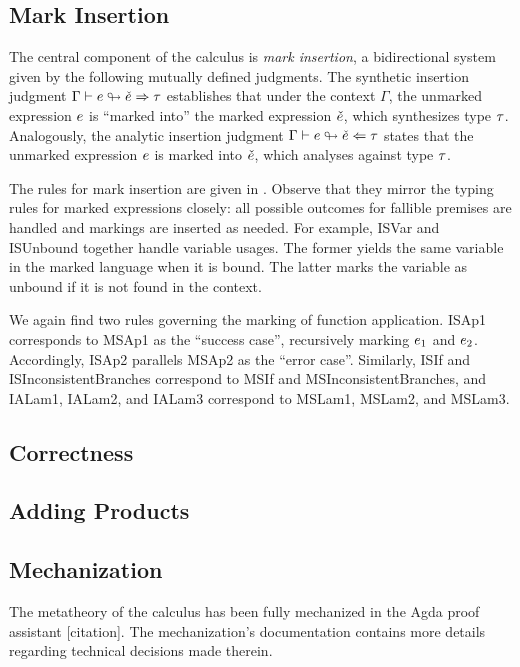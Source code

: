 \subsection{Mark Insertion}
\label{sec:calculus-marking}

The central component of the calculus is \emph{mark insertion}, a bidirectional system given by the
following mutually defined judgments. The synthetic insertion judgment
$\Gamma \vdash e \looparrowright \check{e} \Rightarrow \tau$ establishes that under the context $\Gamma$, the
unmarked expression $e$ is ``marked into'' the marked expression $\check{e}$, which synthesizes type
$\tau$. Analogously, the analytic insertion judgment $\Gamma \vdash e \looparrowright \check{e} \Leftarrow \tau$
states that the unmarked expression $e$ is marked into $\check{e}$, which analyses against type
$\tau$.




The rules for mark insertion are given in . Observe that they
mirror the typing rules for marked expressions closely: all possible outcomes for fallible premises
are handled and markings are inserted as needed. For example, ISVar and ISUnbound together handle
variable usages. The former yields the same variable in the marked language when it is bound. The
latter marks the variable as unbound if it is not found in the context.

We again find two rules governing the marking of function application. ISAp1 corresponds to MSAp1 as
the ``success case'', recursively marking $e_1$ and $e_2$. Accordingly, ISAp2 parallels MSAp2
as the ``error case''. Similarly, ISIf and ISInconsistentBranches correspond to MSIf and
MSInconsistentBranches, and IALam1, IALam2, and IALam3 correspond to MSLam1, MSLam2, and MSLam3.

\subsection{Correctness}
\label{sec:calculus-correctness}




\subsection{Adding Products}
\label{sec:calculus-products}

\subsection{Mechanization}
\label{sec:calculus-agda}

The metatheory of the calculus has been fully mechanized in the Agda proof assistant [citation]. The
mechanization's documentation contains more details regarding technical decisions made therein.
